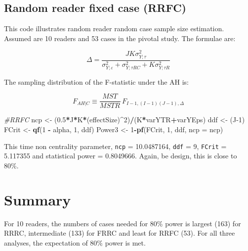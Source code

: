 \documentclass[]{book}
\newenvironment{Shaded}{\begin{snugshade}}{\end{snugshade}}
\newcommand{\CommentTok}[1]{\textcolor[rgb]{0.56,0.35,0.01}{\textit{#1}}}
\newcommand{\DataTypeTok}[1]{\textcolor[rgb]{0.13,0.29,0.53}{#1}}
\newcommand{\DecValTok}[1]{\textcolor[rgb]{0.00,0.00,0.81}{#1}}
\newcommand{\FloatTok}[1]{\textcolor[rgb]{0.00,0.00,0.81}{#1}}
\newcommand{\KeywordTok}[1]{\textcolor[rgb]{0.13,0.29,0.53}{\textbf{#1}}}
\newcommand{\NormalTok}[1]{#1}
\newcommand{\OperatorTok}[1]{\textcolor[rgb]{0.81,0.36,0.00}{\textbf{#1}}}
\newcommand{\StringTok}[1]{\textcolor[rgb]{0.31,0.60,0.02}{#1}}
\begin{document}
\hypertarget{random-reader-fixed-case-rrfc}{%
\subsection{Random reader fixed case (RRFC)}\label{random-reader-fixed-case-rrfc}}

This code illustrates random reader random case sample size estimation. Assumed are 10 readers and 53 cases in the pivotal study. The formulae are:

\[\Delta =\frac{JK\sigma _{Y;\tau }^{2}}{\sigma _{Y;\varepsilon }^{2}+\sigma _{Y;\tau RC}^{2}+K\sigma _{Y;\tau R}^{2}}\]

The sampling distribution of the F-statistic under the AH is:

\[{{F}_{\left. AH \right|C}}\equiv \frac{MST}{MSTR}\tilde{\ }{{F}_{I-1,\left( I-1 \right)\left( J-1 \right),\Delta }}\]

\begin{Shaded}
\begin{Highlighting}[]
\CommentTok{#RRFC}
\NormalTok{ncp <-}\StringTok{ }\NormalTok{(}\FloatTok{0.5}\OperatorTok{*}\NormalTok{J}\OperatorTok{*}\NormalTok{K}\OperatorTok{*}\NormalTok{(effectSize)}\OperatorTok{^}\DecValTok{2}\NormalTok{)}\OperatorTok{/}\NormalTok{(K}\OperatorTok{*}\NormalTok{varYTR}\OperatorTok{+}\NormalTok{varYEps)}
\NormalTok{ddf <-}\StringTok{ }\NormalTok{(J}\DecValTok{-1}\NormalTok{)}
\NormalTok{FCrit <-}\StringTok{ }\KeywordTok{qf}\NormalTok{(}\DecValTok{1} \OperatorTok{-}\StringTok{ }\NormalTok{alpha, }\DecValTok{1}\NormalTok{, ddf)}
\NormalTok{Power3 <-}\StringTok{ }\DecValTok{1}\OperatorTok{-}\KeywordTok{pf}\NormalTok{(FCrit, }\DecValTok{1}\NormalTok{, ddf, }\DataTypeTok{ncp =}\NormalTok{ ncp)}
\end{Highlighting}
\end{Shaded}

This time non centrality parameter, \texttt{ncp} = 10.0487164, \texttt{ddf} = 9, \texttt{FCrit} = 5.117355 and statistical power = 0.8049666. Again, be design, this is close to 80\%.

\hypertarget{summary-5}{%
\section{Summary}\label{summary-5}}

For 10 readers, the numbers of cases needed for 80\% power is largest (163) for RRRC, intermediate (133) for FRRC and least for RRFC (53). For all three analyses, the expectation of 80\% power is met.
\end{document}
